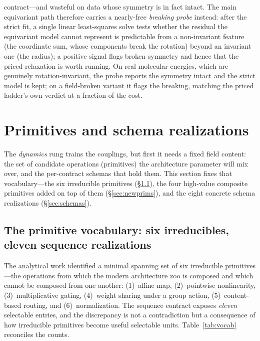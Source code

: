 \documentclass[11pt]{article}
\begin{document}
contract---and wasteful on data whose symmetry is in fact intact. The main equivariant path therefore carries a
nearly-free \emph{breaking probe} instead: after the strict fit, a single linear least-squares solve tests
whether the residual the equivariant model cannot represent is predictable from a non-invariant feature (the
coordinate sum, whose components break the rotation) beyond an invariant one (the radius); a positive signal
flags broken symmetry and hence that the priced relaxation is worth running. On real molecular energies, which
are genuinely rotation-invariant, the probe reports the symmetry intact and the strict model is kept; on a
field-broken variant it flags the breaking, matching the priced ladder's own verdict at a fraction of the cost.

\section{Primitives and schema realizations}
\label{sec:primitives-group}

The \emph{dynamics} rung trains the couplings, but first it needs a fixed field content: the set of
candidate operations (primitives) the architecture parameter will mix over, and the per-contract
schemas that hold them. This section fixes that vocabulary---the six irreducible primitives
(\S\ref{sec:vocab}), the four high-value composite primitives added on top of them
(\S\ref{sec:newprims}), and the eight concrete schema realizations (\S\ref{sec:schemas}).

\subsection{The primitive vocabulary: six irreducibles, eleven sequence realizations}
\label{sec:vocab}

The analytical work identified a minimal spanning set of six irreducible primitives---the
operations from which the modern architecture zoo is composed and which cannot be composed from
one another: (1)~affine map, (2)~pointwise nonlinearity, (3)~multiplicative gating, (4)~weight
sharing under a group action, (5)~content-based routing, and (6)~normalization. The
sequence contract exposes \emph{eleven} selectable entries, and the discrepancy is not a
contradiction but a consequence of how irreducible primitives become useful selectable units.
Table~\ref{tab:vocab} reconciles the counts.
\end{document}
